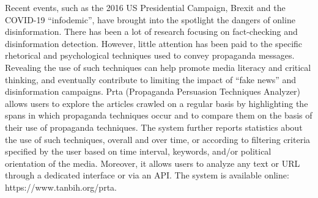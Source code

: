 Recent events, such as the 2016 US Presidential Campaign, Brexit and the COVID-19 ``infodemic'', have brought into the spotlight the dangers of online disinformation. There has been a lot of research focusing on fact-checking and disinformation detection. However, little attention has been paid to the specific rhetorical and psychological techniques used to convey propaganda messages. Revealing the use of such techniques can help promote media literacy and critical thinking, and eventually contribute to limiting the impact of ``fake news'' and disinformation campaigns. Prta (Propaganda Persuasion Techniques Analyzer) allows users to explore the articles crawled on a regular basis by highlighting the spans in which propaganda techniques occur and to compare them on the basis of their use of propaganda techniques. The system further reports statistics about the use of such techniques, overall and over time, or according to filtering criteria specified by the user based on time interval, keywords, and/or political orientation of the media. Moreover, it allows users to analyze any text or URL through a dedicated interface or via an API. The system is available online: https://www.tanbih.org/prta.
